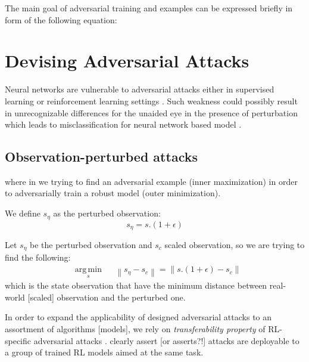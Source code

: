 \documentclass{article}
\DeclareMathOperator*{\argmin}{arg\,min}
\newcommand{\norm}[1]{\left\lVert#1\right\rVert}        %
\begin{document}
    The main goal of adversarial training and examples can be expressed briefly in form of the following equation:

    \section{Devising Adversarial Attacks}
    Neural networks are vulnerable to adversarial attacks either in supervised learning or reinforcement learning settings \cite{Huang2017}. Such weakness could possibly result in unrecognizable differences for the unaided eye in the presence of perturbation which leads to misclassification for neural network based model \cite{Szegedy2014, Goodfellow2014}.


    \subsection{Observation-perturbed attacks}


    where in we trying to find an adversarial example (inner maximization) in order to adversarially train a robust model (outer minimization).

    We define $s_\eta$ as the perturbed observation:
    \begin{equation}
        s_\eta = s . (1 + \epsilon)
    \end{equation}


    Let $s_\eta$ be the perturbed observation and $s_c$ scaled observation, so we are trying to find the following:
    \begin{equation}
        \begin{aligned}
            & \underset{s}{\argmin}
            & & {\norm{s_\eta - s_c}} = \norm{s . (1 + \epsilon) - s_c}
        \end{aligned}
    \end{equation}
    which is the state observation that have the minimum distance between real-world [scaled] observation and the perturbed one.

    In order to expand the applicability of designed adversarial attacks to an assortment of algorithms [models], we rely on \textit{transferability property} of RL-specific adversarial attacks \cite{Szegedy2014, Papernot2016, Goodfellow2014a}. \cite{Huang2017} clearly assert [or asserts?!] attacks are deployable to a group of trained RL models aimed at the same task.
\end{document}
